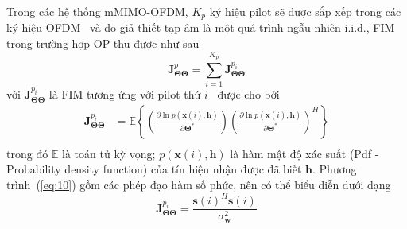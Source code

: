 Trong các hệ thống mMIMO-OFDM, $K_p$ ký hiệu pilot sẽ được sắp xếp trong các ký hiệu OFDM~\cite{Garro2020} và do giả thiết tạp âm là một quá trình ngẫu nhiên i.i.d., FIM trong trường hợp OP thu được như sau
\begin{equation}
\label{eq:9}
    \mathbf{J}_{\boldsymbol{\Theta} \boldsymbol{\Theta}}^{p}=\sum_{i=1}^{K_{p}} \mathbf{J}_{\boldsymbol{\Theta} \boldsymbol{\Theta}}^{p_{i}}
\end{equation}
với $\mathbf{J}_{\boldsymbol{\Theta} \boldsymbol{\Theta}}^{p_{i}}$ là FIM tương ứng với pilot thứ $i$~\cite{Kay1993} được cho bởi
\begin{equation}
    \label{eq:10}
    \begin{aligned}
        \mathbf{J}_{\boldsymbol{\Theta} \boldsymbol{\Theta}}^{p_{i}} &=\mathbb{E}\left\{\left(\frac{\partial \ln p(\mathbf{x}(i), \mathbf{h})}{\partial \boldsymbol{\Theta}^{*}}\right)\left(\frac{\partial \ln p(\mathbf{x}(i), \mathbf{h})}{\partial \boldsymbol{\Theta}^{*}}\right)^{H}\right\} \\
    \end{aligned}
\end{equation}
trong đó $\mathbb{E}$ là toán tử kỳ vọng; $p(\mathbf{x}(i), \mathbf{h})$ là hàm mật độ xác suất (Pdf - Probability density function) của tín hiệu nhận được đã biết $\mathbf{h}$. Phương trình~(\ref{eq:10}) gồm các phép đạo hàm số phức, nên có thể biểu diễn dưới dạng
\begin{equation}
    \mathbf{J}_{\boldsymbol{\Theta} \mathbf{\Theta}}^{p_{i}}=\frac{\mathbf{s}(i)^{H} \mathbf{s}(i)}{\sigma_{\mathbf{w}}^{2}}
\end{equation}

